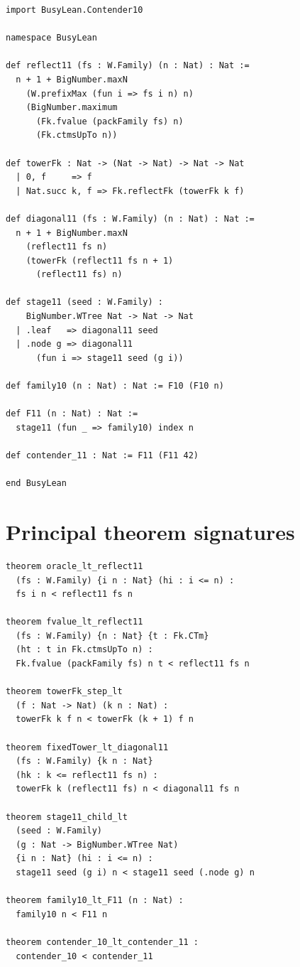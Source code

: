 \documentclass[11pt]{article}
\theoremstyle{definition}
\theoremstyle{remark}
\begin{document}
\begin{lstlisting}
import BusyLean.Contender10

namespace BusyLean

def reflect11 (fs : W.Family) (n : Nat) : Nat :=
  n + 1 + BigNumber.maxN
    (W.prefixMax (fun i => fs i n) n)
    (BigNumber.maximum
      (Fk.fvalue (packFamily fs) n)
      (Fk.ctmsUpTo n))

def towerFk : Nat -> (Nat -> Nat) -> Nat -> Nat
  | 0, f     => f
  | Nat.succ k, f => Fk.reflectFk (towerFk k f)

def diagonal11 (fs : W.Family) (n : Nat) : Nat :=
  n + 1 + BigNumber.maxN
    (reflect11 fs n)
    (towerFk (reflect11 fs n + 1)
      (reflect11 fs) n)

def stage11 (seed : W.Family) :
    BigNumber.WTree Nat -> Nat -> Nat
  | .leaf   => diagonal11 seed
  | .node g => diagonal11
      (fun i => stage11 seed (g i))

def family10 (n : Nat) : Nat := F10 (F10 n)

def F11 (n : Nat) : Nat :=
  stage11 (fun _ => family10) index n

def contender_11 : Nat := F11 (F11 42)

end BusyLean
\end{lstlisting}

\section{Principal theorem signatures}

\begin{lstlisting}
theorem oracle_lt_reflect11
  (fs : W.Family) {i n : Nat} (hi : i <= n) :
  fs i n < reflect11 fs n

theorem fvalue_lt_reflect11
  (fs : W.Family) {n : Nat} {t : Fk.CTm}
  (ht : t in Fk.ctmsUpTo n) :
  Fk.fvalue (packFamily fs) n t < reflect11 fs n

theorem towerFk_step_lt
  (f : Nat -> Nat) (k n : Nat) :
  towerFk k f n < towerFk (k + 1) f n

theorem fixedTower_lt_diagonal11
  (fs : W.Family) {k n : Nat}
  (hk : k <= reflect11 fs n) :
  towerFk k (reflect11 fs) n < diagonal11 fs n

theorem stage11_child_lt
  (seed : W.Family)
  (g : Nat -> BigNumber.WTree Nat)
  {i n : Nat} (hi : i <= n) :
  stage11 seed (g i) n < stage11 seed (.node g) n

theorem family10_lt_F11 (n : Nat) :
  family10 n < F11 n

theorem contender_10_lt_contender_11 :
  contender_10 < contender_11
\end{lstlisting}
\end{document}
